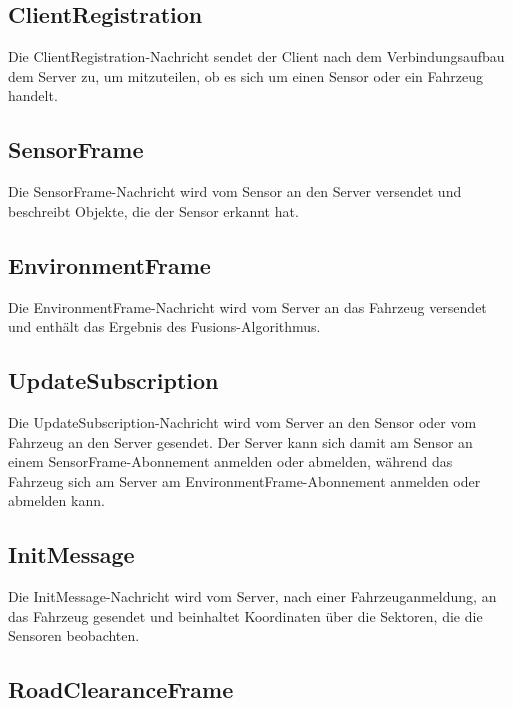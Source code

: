 \subsection{ClientRegistration}
\label{msg:client_registration}

Die ClientRegistration-Nachricht sendet der Client nach dem Verbindungsaufbau dem Server zu, um mitzuteilen, ob es sich um einen Sensor oder ein Fahrzeug handelt.

\subsection{SensorFrame}
\label{msg:sensor_frame}

Die SensorFrame-Nachricht wird vom Sensor an den Server versendet und beschreibt Objekte, die der Sensor erkannt hat.

\subsection{EnvironmentFrame}
\label{msg:environment_frame}

Die EnvironmentFrame-Nachricht wird vom Server an das Fahrzeug versendet und enthält das Ergebnis des Fusions-Algorithmus.

\subsection{UpdateSubscription}
\label{msg:update_subscription}

Die UpdateSubscription-Nachricht wird vom Server an den Sensor oder vom Fahrzeug an den Server gesendet.
Der Server kann sich damit am Sensor an einem SensorFrame-Abonnement anmelden oder abmelden, während das Fahrzeug sich am Server am EnvironmentFrame-Abonnement anmelden oder abmelden kann.

\subsection{InitMessage}
\label{msg:init_message}

Die InitMessage-Nachricht wird vom Server, nach einer Fahrzeuganmeldung, an das Fahrzeug gesendet und beinhaltet Koordinaten über die Sektoren, die die Sensoren beobachten.

\subsection{RoadClearanceFrame}

